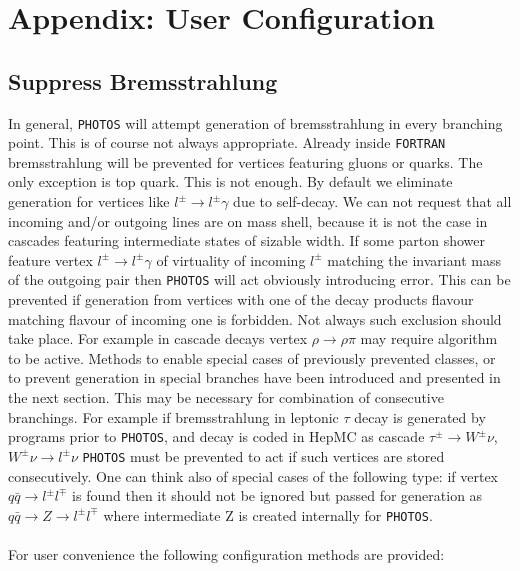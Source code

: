 \documentclass[]{Photos_interface_design}
\begin{document}
\section{Appendix: User Configuration}
\label{sec:User Configuration}

\subsection{Suppress Bremsstrahlung}
\label{section:suppress}

In general, {\tt PHOTOS} will attempt generation of bremsstrahlung in every 
branching point. This is of course not always appropriate.
Already inside {\tt FORTRAN} bremsstrahlung will be prevented for vertices featuring gluons or quarks.
The only exception is top quark. This is not enough. By default we eliminate 
generation for vertices like $l^\pm \to l^\pm \gamma$ due to self-decay.
We can not request that all incoming and/or outgoing 
lines are on mass shell, because it is not the case in cascades featuring 
intermediate states of sizable width. If some parton shower feature
vertex  $l^\pm \to l^\pm \gamma$ of virtuality of incoming $l^\pm$ 
matching the invariant mass of the outgoing pair then {\tt PHOTOS} will act
obviously introducing error. This can be prevented if generation from vertices
with one of the decay products flavour matching flavour of incoming 
one is forbidden. Not always such exclusion should take place. For example
in cascade decays vertex $\rho \to \rho \pi$ may require algorithm to be 
active. Methods to enable special cases of previously prevented classes, or to
prevent generation in special branches have been introduced and presented in the next section.
This may be necessary for combination of consecutive branchings. For example if bremsstrahlung
in leptonic $\tau$ decay is generated by programs prior to {\tt PHOTOS}, and decay is coded in HepMC as cascade $\tau^\pm \to W^\pm \nu$, $W^\pm \nu \to l^\pm \nu$
{\tt PHOTOS} must be prevented to act if such vertices are stored consecutively.
One can think also of special cases of the following type:
if vertex $q \bar q \to l^\pm l^\mp$ is found then it should not be ignored
but passed for generation as $q \bar q \to Z \to l^\pm l^\mp$ where intermediate Z is created internally for {\tt PHOTOS}. \\
\\
For user convenience the following configuration methods are provided:
\end{document}
